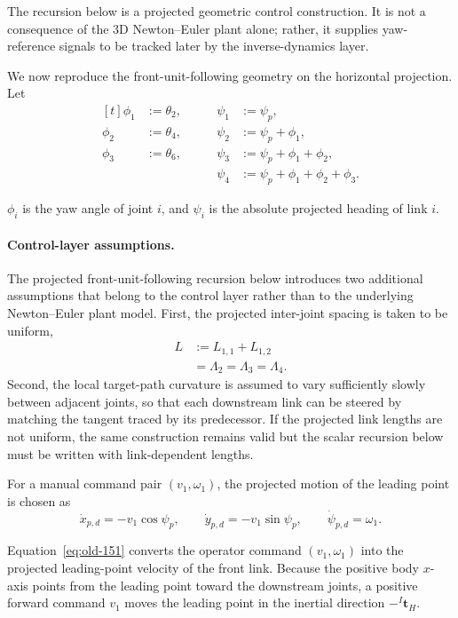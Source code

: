 \documentclass[12pt,a4paper]{report}
\newcommand{\newsymbols}[1]{\par\noindent{}#1\par\vspace{0.35em}}
\newcommand{\formulaannotation}[1]{\par\noindent{}#1\par\vspace{0.35em}}
\begin{document}
The recursion below is a projected geometric control construction. It is not a consequence of the 3D Newton--Euler plant alone; rather, it supplies yaw-reference signals to be tracked later by the inverse-dynamics layer.

We now reproduce the front-unit-following geometry on the horizontal projection. Let
\begin{equation}
\begin{aligned}[t]
\phi_1 &:= \theta_{2},
&\qquad
\psi_1 &:= \psi_p, \\
\phi_2 &:= \theta_{4},
&\qquad
\psi_2 &:= \psi_p + \phi_1, \\
\phi_3 &:= \theta_{6},
&\qquad
\psi_3 &:= \psi_p + \phi_1 + \phi_2, \\
&
&\qquad
\psi_4 &:= \psi_p + \phi_1 + \phi_2 + \phi_3.
\end{aligned}
\end{equation}
\newsymbols{$\phi_i$ is the yaw angle of joint $i$, and $\psi_i$ is the absolute projected heading of link $i$.}
\paragraph{Control-layer assumptions.}
The projected front-unit-following recursion below introduces two additional assumptions that belong to the control layer rather than to the underlying Newton--Euler plant model. First, the projected inter-joint spacing is taken to be uniform,
\begin{equation}
\begin{aligned}
L &:= L_{1,1}+L_{1,2} \\
  &= \Lambda_2 = \Lambda_3 = \Lambda_4.
\end{aligned}
\end{equation}
Second, the local target-path curvature is assumed to vary sufficiently slowly between adjacent joints, so that each downstream link can be steered by matching the tangent traced by its predecessor. If the projected link lengths are not uniform, the same construction remains valid but the scalar recursion below must be written with link-dependent lengths.

For a manual command pair $(v_1,\omega_1)$, the projected motion of the leading point is chosen as
\begin{equation}
\dot{x}_{p,d} = -v_1 \cos \psi_p,
\qquad
\dot{y}_{p,d} = -v_1 \sin \psi_p,
\qquad
\dot{\psi}_{p,d} = \omega_1.
\label{eq:old-151}
\end{equation}
\formulaannotation{Equation~\eqref{eq:old-151} converts the operator command $(v_1,\omega_1)$ into the projected leading-point velocity of the front link. Because the positive body $x$-axis points from the leading point toward the downstream joints, a positive forward command $v_1$ moves the leading point in the inertial direction $-{}^{I}\mathbf{t}_H$.}
\end{document}
